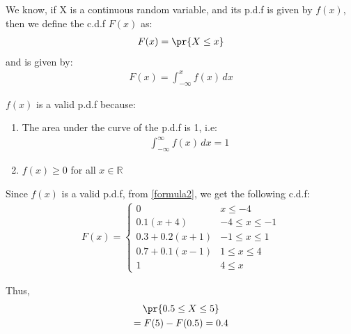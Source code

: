 
We know, if X is a continuous random variable, and its p.d.f is given by $f(x)$, then we define the c.d.f $F(x)$ as:
\begin{align}
F(x) = \pr{X \leq x} 
\label{formula1}
\end{align}
and is given by:
\begin{align}
F(x) = \int_{-\infty}^{x}f(x)\,dx 
\label{formula2}
\end{align}

$f(x)$ is a valid p.d.f because: 
\begin{enumerate}
    \item The area under the curve of the p.d.f is 1, i.e:
    \begin{align}
        \int_{-\infty}^{\infty} f(x)\,dx = 1
    \end{align}
    \item $f(x) \geq 0$ for all $x \in \mathbb{R}$\\
\end{enumerate}
Since $f(x)$ is a valid p.d.f, from \eqref{formula2}, we get the following c.d.f:
\begin{align}
F(x) = 
\begin{cases}
0 & x \leq -4
\\
0.1(x + 4) & -4\leq x\leq -1
\\
0.3 + 0.2(x+1) & -1 \leq x \leq 1
\\
0.7 + 0.1(x-1) & 1 \leq x \leq 4
\\
1 & 4 \leq x
\end{cases}
\label{cdf}
\end{align}


    Thus,
    \begin{multline}
    \pr{0.5 \leq X \leq 5} \\ =F(5) - F(0.5) = 0.4
    \end{multline}

